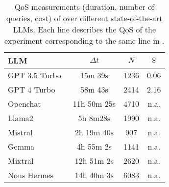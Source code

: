 \begin{table}
    \caption[\llmfkg{} \gls{QoS} measurements]{%
        \Gls{QoS} measurements (duration, number of queries, cost) of \llmfkg{} over different state-of-the-art LLMs.
        Each line describes the \gls{QoS} of the experiment corresponding to the same line in .
    }
    \centering
    \begin{tabular}{l | c c c} \toprule
        LLM & $\mathit{\Delta t}$ & $\mathit{N}$ & $\$$
        \\ \midrule
        GPT 3.5 Turbo~\cite{gpt3-2020} & 15m 39s & 1236 & 0.06
        \\
        GPT 4 Turbo~\cite{gpt4} & 58m 43s & 2414 & 2.16
        \\ \midrule
        Openchat~\cite{wang2023openchat} & 11h 50m 25s & 4710 & n.a.
        \\
        Llama2~\cite{llama2-2023} & 5h 8m28s & 1990 & n.a.
        \\
        Mistral~\cite{mistral} & 2h 19m 40s & 907 & n.a.
        \\
        Gemma~\cite{gemini} & 4h 55m 2s & 1141 & n.a.
        \\ \midrule
        Mixtral~\cite{mixtral} & 12h 51m 2s & 2620 & n.a.
        \\
        Nous Hermes & 14h 40m 3s & 6083 & n.a.
        \\ \bottomrule
    \end{tabular}
    \label{tab:kgfiller-qos}
\end{table}
